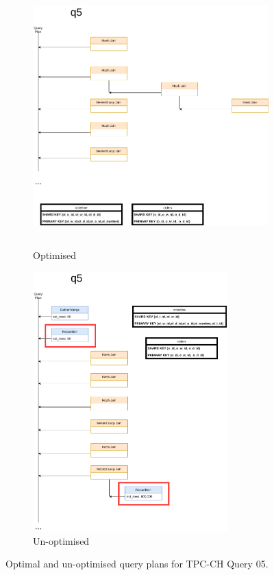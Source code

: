 \begin{figure}
     \centering
     \begin{subfigure}[b]{0.45\textwidth}
          \centering
          \includegraphics[height=10cm]{figures/query_05_plan_01_opt.png}
          \caption{Optimised}
          \label{fig:tpc-ch-query-05-plan}
     \end{subfigure}
     \hfill
     \begin{subfigure}[b]{0.45\textwidth}
          \centering
          \includegraphics[height=10cm]{figures/query_05_plan_01_unopt.png}
          \caption{Un-optimised}
          \label{fig:tpc-ch-query-05-plan-unopt}
     \end{subfigure}
     \caption{Optimal and un-optimised query plans for TPC-CH Query 05.}
\end{figure}

